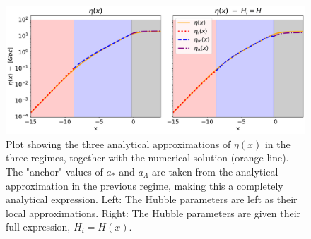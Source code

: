 \documentclass[10pt, a4paper]{article}
\begin{document}
\begin{figure}[H]
    \centering
    \includegraphics[scale=0.5]{../m1_figs/Eta2.pdf}
    \caption{Plot showing the three analytical approximations of $\eta(x)$ in the three regimes, together with the numerical solution (orange line). The "anchor" values of $a_*$ and $a_\Lambda$ are taken from the analytical approximation in the previous regime, making this a completely analytical expression. Left: The Hubble parameters are left as their local approximations. Right: The Hubble parameters are given their full expression, $H_i = H(x)$.}
    \label{fig:Eta2}
\end{figure}
\end{document}
